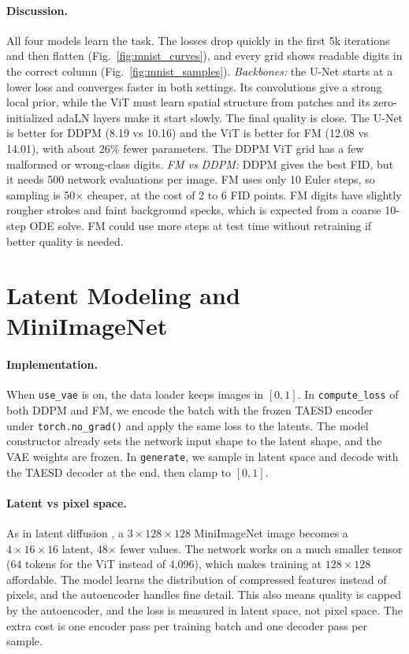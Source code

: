 \documentclass[11pt]{article}
\begin{document}
\paragraph{Discussion.} All four models learn the task. The losses drop quickly in the first 5k iterations and then flatten (Fig.~\ref{fig:mnist_curves}), and every grid shows readable digits in the correct column (Fig.~\ref{fig:mnist_samples}).
\emph{Backbones:} the U-Net starts at a lower loss and converges faster in both settings. Its convolutions give a strong local prior, while the ViT must learn spatial structure from patches and its zero-initialized adaLN layers make it start slowly. The final quality is close. The U-Net is better for DDPM (8.19 vs 10.16) and the ViT is better for FM (12.08 vs 14.01), with about 26\% fewer parameters. The DDPM ViT grid has a few malformed or wrong-class digits.
\emph{FM vs DDPM:} DDPM gives the best FID, but it needs 500 network evaluations per image. FM uses only 10 Euler steps, so sampling is 50$\times$ cheaper, at the cost of 2 to 6 FID points. FM digits have slightly rougher strokes and faint background specks, which is expected from a coarse 10-step ODE solve. FM could use more steps at test time without retraining if better quality is needed.

\section{Latent Modeling and MiniImageNet}

\paragraph{Implementation.} When \texttt{use\_vae} is on, the data loader keeps images in $[0,1]$. In \texttt{compute\_loss} of both DDPM and FM, we encode the batch with the frozen TAESD \cite{taesd} encoder under \texttt{torch.no\_grad()} and apply the same loss to the latents. The model constructor already sets the network input shape to the latent shape, and the VAE weights are frozen. In \texttt{generate}, we sample in latent space and decode with the TAESD decoder at the end, then clamp to $[0,1]$.

\paragraph{Latent vs pixel space.} As in latent diffusion \cite{rombach2022ldm}, a $3\times128\times128$ MiniImageNet \cite{vinyals2016miniimagenet} image becomes a $4\times16\times16$ latent, 48$\times$ fewer values. The network works on a much smaller tensor (64 tokens for the ViT instead of 4,096), which makes training at $128\times128$ affordable. The model learns the distribution of compressed features instead of pixels, and the autoencoder handles fine detail. This also means quality is capped by the autoencoder, and the loss is measured in latent space, not pixel space. The extra cost is one encoder pass per training batch and one decoder pass per sample.
\end{document}
